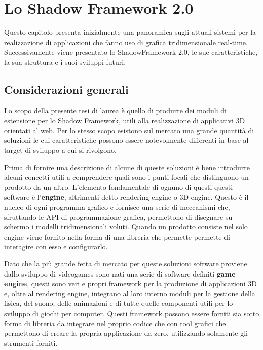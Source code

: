 
\chapter{Lo Shadow Framework 2.0}
\label{ch:shadowframework}
Questo capitolo presenta inizialmente una panoramica sugli attuali sistemi per la realizzazione di applicazioni che fanno uso di grafica tridimensionale real-time. Successivamente viene presentato lo ShadowFramework 2.0, le sue caratteristiche, la sua struttura e i suoi sviluppi futuri.


\section{Considerazioni generali}
\label{sec:considerazionigenerali}
Lo scopo della presente tesi di laurea \`e quello di produrre dei moduli di estensione per lo Shadow Framework, utili alla realizzazione di applicativi 3D orientati al web. 
Per lo stesso scopo esistono sul mercato una grande quantit\`a di soluzioni le cui caratteristiche possono essere notevolmente differenti in base al target di sviluppo a cui si rivolgono.

Prima di fornire una descrizione di alcune di queste soluzioni \`e bene introdurre alcuni concetti utili a comprendere quali sono i punti focali che distinguono un prodotto da un altro. L'elemento fondamentale di ognuno di questi questi software \`e l'\textbf{engine}, altrimenti detto rendering engine o 3D-engine. Questo \`e il nucleo di ogni programma grafico e fornisce una serie di meccanismi che, sfruttando le \ac{API} di programmazione grafica, permettono di disegnare su schermo i modelli tridimensionali voluti. Quando un prodotto consiste nel solo engine viene fornito nella forma di una libreria che permette permette di interagire con esso e configurarlo.

Dato che la pi\`u grande fetta di mercato per queste soluzioni software proviene dallo sviluppo di videogames sono nati una serie di software definiti \textbf{game engine}, questi sono veri e propri framework per la produzione di applicazioni 3D e, oltre al rendering engine, integrano al loro interno moduli per la gestione della fisica, del suono, delle animazioni e di tutte quelle componenti utili per lo sviluppo di giochi per computer. Questi framework possono essere forniti sia sotto forma di libreria da integrare nel proprio codice che con tool grafici che permettono di creare la propria applicazione da zero, utilizzando solamente gli strumenti forniti.

